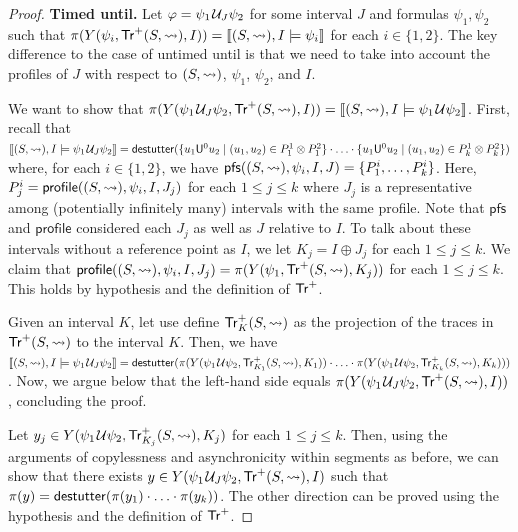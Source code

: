 \begin{proof}
	\noindent\textbf{Timed until.}
	Let $\varphi = \psi_1 \kern.1em\mathcal{U}_J \psi_2$ for some interval $J$ and formulas $\psi_1, \psi_2$ such that $\pi(Y(\psi_i, \mathsf{Tr}^+(S,{\rightsquigarrow}), I)) = \llbracket (S,{\rightsquigarrow}), I \models \psi_i \rrbracket$ for each $i \in \{1,2\}$.
	The key difference to the case of untimed until is that we need to take into account the profiles of $J$ with respect to $(S,{\rightsquigarrow})$, $\psi_1$, $\psi_2$, and $I$.
	
	We want to show that $\pi(Y(\psi_1 \kern.1em\mathcal{U}_J \psi_2, \mathsf{Tr}^+(S,{\rightsquigarrow}), I)) = \llbracket (S,{\rightsquigarrow}), I \models \psi_1 \kern.1em\mathcal{U} \psi_2 \rrbracket$.
	First, recall that $\llbracket (S,{\hb}), I \models \psi_1 \until_J \psi_2 \rrbracket = \destutter( \{ u_1 \mathsf{U}^0 u_2 \st (u_1, u_2) \in P^1_1 \otimes P^2_1 \} \cdot \ldots \cdot \{ u_1 \mathsf{U}^0 u_2 \st (u_1, u_2) \in P^1_k \otimes P^2_k \} )$ where, for each $i \in \{1,2\}$, we have $\mathsf{pfs}((S,{\rightsquigarrow}), \psi_i, I, J) = \{P^i_1, \ldots, P^i_k\}$.
	Here, $P^i_j = \mathsf{profile}((S,{\rightsquigarrow}), \psi_i, I, J_j)$ for each $1 \leq j \leq k$ where $J_j$ is a representative among (potentially infinitely many) intervals with the same profile.
	Note that $\mathsf{pfs}$ and $\mathsf{profile}$ considered each $J_j$ as well as $J$ relative to $I$.
	To talk about these intervals without a reference point as $I$, we let $K_j = I \oplus J_j$ for each $1 \leq j \leq k$.
	We claim that $\mathsf{profile}((S,{\rightsquigarrow}), \psi_i, I, J_j) = \pi(Y(\psi_1, \mathsf{Tr}^+(S,{\rightsquigarrow}), K_j))$ for each $1 \leq j \leq k$.
	This holds by hypothesis and the definition of $\mathsf{Tr}^+$.
	
	Given an interval $K$, let use define $\mathsf{Tr}^+_K(S,{\rightsquigarrow})$ as the projection of the traces in $\mathsf{Tr}^+(S,{\rightsquigarrow})$ to the interval $K$.
	Then, we have $\llbracket (S,{\rightsquigarrow}), I \models \psi_1 \kern.1em\mathcal{U}_J \psi_2 \rrbracket = \mathsf{destutter}( \pi(Y(\psi_1 \kern.1em\mathcal{U} \psi_2, \mathsf{Tr}^+_{K_1}(S,{\rightsquigarrow}), K_1)) \cdot \ldots \cdot \pi(Y(\psi_1 \kern.1em\mathcal{U} \psi_2, \mathsf{Tr}^+_{K_k}(S,{\rightsquigarrow}), K_k)) )$.
	Now, we argue below that the left-hand side equals $\pi(Y(\psi_1 \kern.1em\mathcal{U}_J \psi_2, \mathsf{Tr}^+(S,{\rightsquigarrow}), I ))$, concluding the proof.

	Let $y_j \in Y(\psi_1 \kern.1em\mathcal{U} \psi_2, \mathsf{Tr}^+_{K_j}(S,{\rightsquigarrow}), K_j)$ for each $1 \leq j \leq k$.
	Then, using the arguments of copylessness and asynchronicity within segments as before, we can show that there exists $y \in Y(\psi_1 \kern.1em\mathcal{U}_J \psi_2, \mathsf{Tr}^+(S,{\rightsquigarrow}), I)$ such that $\pi(y) = \mathsf{destutter}( \pi(y_1) \cdot \ldots \cdot \pi(y_k) )$.
	The other direction can be proved using the hypothesis and the definition of $\mathsf{Tr}^+$.
%	
\end{proof}

